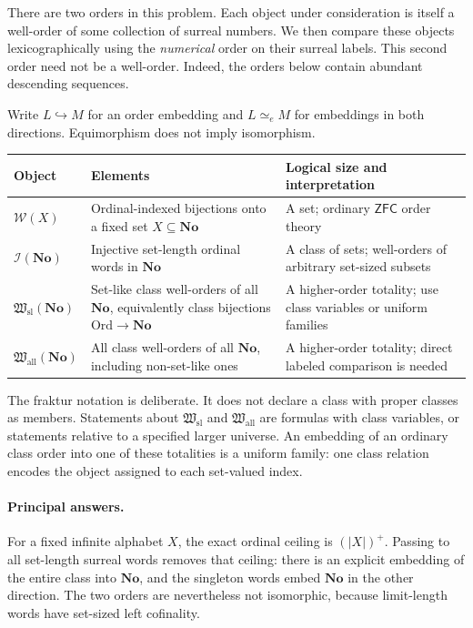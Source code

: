 \documentclass[11pt]{article}
\theoremstyle{definition}
\theoremstyle{remark}
\newcommand{\No}{\mathbf{No}}
\newcommand{\Ord}{\mathrm{Ord}}
\newcommand{\WO}{\mathcal W}
\newcommand{\Words}{\mathcal I}
\newcommand{\Hsl}{\mathfrak W_{\mathrm{sl}}}
\newcommand{\Hall}{\mathfrak W_{\mathrm{all}}}
\newcommand{\emb}{\hookrightarrow}
\newcommand{\equi}{\mathrel{\simeq_{\!e}}}
\newcommand{\ZFC}{\mathsf{ZFC}}
\newcommand{\card}[1]{\lvert #1\rvert}
\begin{document}
There are two orders in this problem. Each object under consideration is
itself a well-order of some collection of surreal numbers. We then compare
these objects lexicographically using the \emph{numerical} order on their
surreal labels. This second order need not be a well-order. Indeed, the
orders below contain abundant descending sequences.

Write \(L\emb M\) for an order embedding and \(L\equi M\) for embeddings
in both directions. Equimorphism does not imply isomorphism.

\begin{center}
\small
\begin{tabular}{@{}>{\raggedright\arraybackslash}p{}>{\raggedright\arraybackslash}p{}>{\raggedright\arraybackslash}p{}@{}}
\toprule
Object & Elements & Logical size and interpretation\\
\midrule
\(\WO(X)\) & Ordinal-indexed bijections onto a fixed set \(X\subseteq\No\)
& A set; ordinary \(\ZFC\) order theory\\[4pt]
\(\Words(\No)\) & Injective set-length ordinal words in \(\No\)
& A class of sets; well-orders of arbitrary set-sized subsets\\[4pt]
\(\Hsl(\No)\) & Set-like class well-orders of all \(\No\), equivalently
class bijections \(\Ord\to\No\)
& A higher-order totality; use class variables or uniform families\\[4pt]
\(\Hall(\No)\) & All class well-orders of all \(\No\), including
non-set-like ones
& A higher-order totality; direct labeled comparison is needed\\
\bottomrule
\end{tabular}
\end{center}

The fraktur notation is deliberate. It does not declare a class with
proper classes as members. Statements about \(\Hsl\) and \(\Hall\)
are formulas with class variables, or statements relative to a specified
larger universe. An embedding of an ordinary class order into one of these
totalities is a uniform family: one class relation encodes the object
assigned to each set-valued index.

\paragraph{Principal answers.}
For a fixed infinite alphabet \(X\), the exact ordinal ceiling is
\((\card X)^+\). Passing to all set-length surreal words removes that
ceiling: there is an explicit embedding of the entire class into
\(\No\), and the singleton words embed \(\No\) in the other direction.
The two orders are nevertheless not isomorphic, because limit-length
words have set-sized left cofinality.
\end{document}
